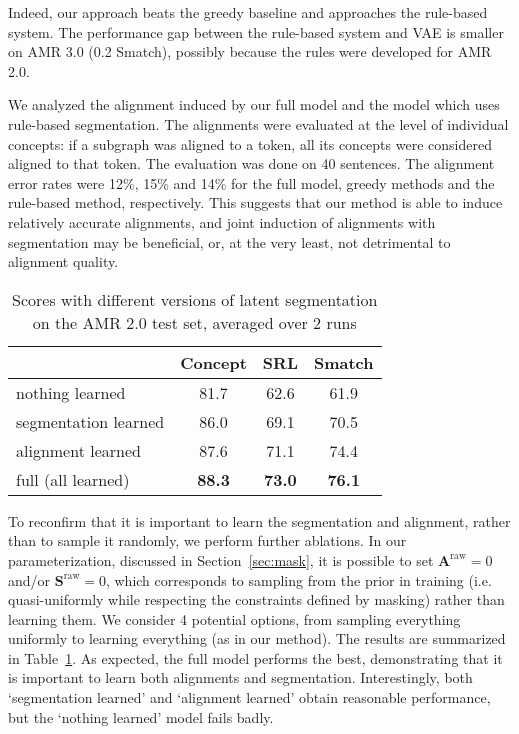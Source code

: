\documentclass[11pt]{article}
\begin{document}
Indeed, our approach beats the greedy baseline and approaches the rule-based system. The performance gap between the rule-based system and VAE is smaller on AMR 3.0 (0.2 Smatch), possibly because the rules were developed for AMR 2.0. 

   \quad
We analyzed the alignment induced by our full model and the model which uses rule-based segmentation. The alignments were evaluated at the level of individual concepts: if a subgraph was aligned to a token, all its concepts were considered aligned to that token. The evaluation was done on 40 sentences. The alignment error rates were 12\%, 15\% and 14\% for the full model, greedy methods and the rule-based method, respectively. This suggests that our method is able to induce relatively accurate alignments, and joint induction of alignments with segmentation may be beneficial, or, at the very least, not detrimental to alignment quality. 


    \quad
\begin{table}[t!] 
    \begin{center} 
        \begin{tabular}{lccc} 
            \hline     &   Concept & SRL &  Smatch \\\hline
nothing learned    & 81.7  &62.6& 61.9\\
          segmentation learned    & 86.0  &69.1& 70.5\\
          alignment learned     & 87.6  &71.1& 74.4\\
          full  (all learned)     & \bf 88.3 &\bf 73.0&\bf 76.1\\ \hline
        \end{tabular}
    \end{center}
    \vspace{-2ex}
	\caption{\label{table:ablation_vae} Scores with different versions of latent segmentation on the AMR 2.0 test set, averaged over 2 runs
    }
    \vspace{-2ex}
\end{table}
To reconfirm that it is important to learn the segmentation and alignment, rather than to sample it randomly, we perform further ablations. In our parameterization, discussed in Section~\ref{sec:mask},  it is possible to set $\mathbf{A}^{\mathrm{raw}}=0 $ and/or $  \mathbf{S}^{\mathrm{raw}}=0$, which corresponds to sampling from the prior in training  (i.e. quasi-uniformly while respecting the constraints defined by masking) rather than learning them. We consider 4 potential options, from sampling everything uniformly to learning everything (as in our method). 
The results are summarized in Table~\ref{table:ablation_vae}. As expected, the full model performs the best, demonstrating that it is important to learn both alignments and segmentation. Interestingly, both  `segmentation learned' and `alignment learned' obtain reasonable performance, but the `nothing learned' model fails badly. 
\end{document}

